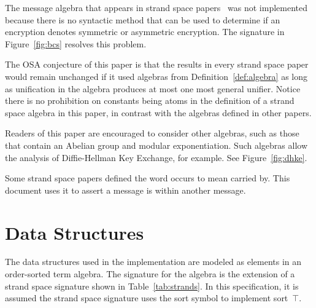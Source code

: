 \documentclass[12pt]{article}
\theoremstyle{definition}
\begin{document}
The message algebra that appears in strand space
papers~\cite{ThayerEtal99,GuttmanThayer02} was not implemented because
there is no syntactic method that can be used to determine if an
encryption denotes symmetric or asymmetric encryption.  The signature
in Figure~\ref{fig:bcs} resolves this problem.

The OSA conjecture of this paper is that the results in every strand
space paper would remain unchanged if it used algebras from
Definition~\ref{def:algebra} as long as unification in the algebra
produces at most one most general unifier.  Notice there is no
prohibition on constants being atoms in the definition of a strand
space algebra in this paper, in contrast with the algebras defined in
other papers.

Readers of this paper are encouraged to consider other algebras, such
as those that contain an Abelian group and modular exponentiation.
Such algebras allow the analysis of Diffie-Hellman Key Exchange, for
example.  See Figure~\ref{fig:dhke}.

Some strand space papers defined the word occurs to mean carried by.
This document uses it to assert a message is within another message.

\section{Data Structures}\label{sec:data structures}

The data structures used in the implementation are modeled as elements
in an order-sorted term algebra.  The signature for the algebra is the
extension of a strand space signature shown in
Table~\ref{tab:strands}.  In this specification, it is assumed the
strand space signature uses the sort symbol  to implement
sort~$\top$.
\end{document}
